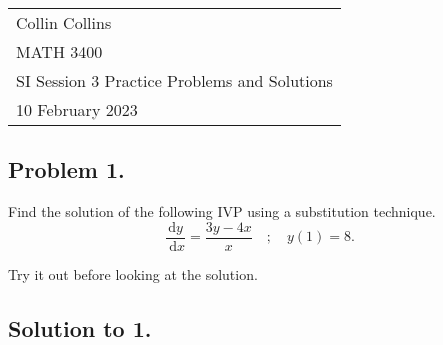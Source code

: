 \documentclass[a4paper,12pt]{article} %
\begin{document}



\thispagestyle{empty} %

\begin{tabular}{p{15.5cm}} %
\\ Collin Collins \\
MATH 3400\\
SI Session 3 Practice Problems and Solutions\\
10 February 2023 \\
\hline %

\end{tabular} 

\subsection*{Problem 1.}

Find the solution of the following IVP using a substitution technique.
$$ \frac{\mathrm{d} y}{\mathrm{~d} x}=\frac{3 y-4 x}{x} \quad;\quad y(1)=8.$$

Try it out before looking at the solution.

\pagebreak

\subsection*{Solution to 1.}
\end{document}
